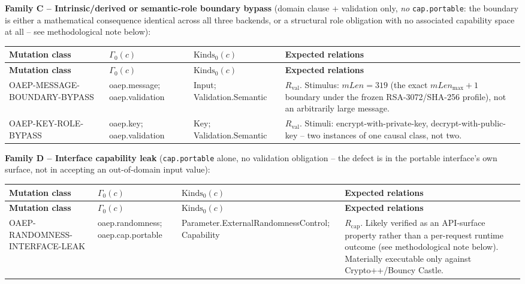 \documentclass[11pt,a4paper]{article}
\begin{document}
\textbf{Family C -- Intrinsic/derived or semantic-role boundary bypass} (domain clause + validation only, \emph{no} \texttt{cap.portable}: the boundary is either a mathematical consequence identical across all three backends, or a structural role obligation with no associated capability space at all -- see methodological note below):
\begin{longtable}{p{}p{}p{}p{}}
\toprule
\textbf{Mutation class} & \textbf{$\Gamma_0(c)$} & \textbf{$\text{Kinds}_0(c)$} & \textbf{Expected relations}\\
\midrule\endfirsthead
\toprule
\textbf{Mutation class} & \textbf{$\Gamma_0(c)$} & \textbf{$\text{Kinds}_0(c)$} & \textbf{Expected relations}\\
\midrule\endhead
OAEP-MESSAGE-BOUNDARY-BYPASS & oaep.message; oaep.validation & Input; Validation.Semantic & $R_{\text{val}}$. Stimulus: $mLen=319$ (the exact $mLen_{\max}+1$ boundary under the frozen RSA-3072/SHA-256 profile), not an arbitrarily large message.\\
OAEP-KEY-ROLE-BYPASS & oaep.key; oaep.validation & Key; Validation.Semantic & $R_{\text{val}}$. Stimuli: encrypt-with-private-key, decrypt-with-public-key -- two instances of one causal class, not two.\\
\bottomrule
\end{longtable}

\textbf{Family D -- Interface capability leak} (\texttt{cap.portable} alone, no validation obligation -- the defect is in the portable interface's own surface, not in accepting an out-of-domain input value):
\begin{longtable}{p{}p{}p{}p{}}
\toprule
\textbf{Mutation class} & \textbf{$\Gamma_0(c)$} & \textbf{$\text{Kinds}_0(c)$} & \textbf{Expected relations}\\
\midrule\endfirsthead
\toprule
\textbf{Mutation class} & \textbf{$\Gamma_0(c)$} & \textbf{$\text{Kinds}_0(c)$} & \textbf{Expected relations}\\
\midrule\endhead
OAEP-RANDOMNESS-INTERFACE-LEAK & oaep.randomness; oaep.cap.portable & Parameter.ExternalRandomnessControl; Capability & $R_{\text{cap}}$. Likely verified as an API-surface property rather than a per-request runtime outcome (see methodological note below). Materially executable only against Crypto++/Bouncy Castle.\\
\bottomrule
\end{longtable}
\end{document}
